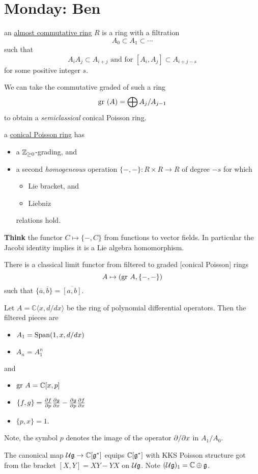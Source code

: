 \newpage 
\section{Monday: Ben}

\begin{definition} 
an \underline{almost commutative ring} $R$ is a ring with a filtration 
\[
    A_0 \subset A_1 \subset \cdots     
\]
such that 
\[
    A_i A_j \subset A_{i+ j} \textrm{ and for }   [A_i , A_j] \subset A_{i+j - s}    
\]
for some positive integer $s$.
\end{definition}

We can take the commutative graded of such a ring
\[
    {\rm gr ~}(A) = \bigoplus A_j / A_{j-1}    
\]
to obtain a \textit{semiclassical} conical Poisson ring.  

\begin{definition} 
a \underline{conical Poisson ring} has
\begin{itemize}
    \item a $\mathbb{Z}_{\ge 0}$-grading, and 
    \item a second \textit{homogeneous} operation $\{-,-\}: R\times R \rightarrow R$ of degree $-s$ for which 
    \begin{itemize}
        \item Lie bracket, and 
        \item Liebniz
    \end{itemize} relations hold.
\end{itemize} 
\end{definition}

\textbf{Think} the functor $C \mapsto \{ - , C\}$ from functions to vector fields. In particular the Jacobi identity implies it is a Lie algebra homomorphism. 

\begin{remark} 
There is a classical limit functor from filtered to graded [conical Poisson] rings 
\[
    A \mapsto ({\rm gr ~} A, \{-,-\})
\] 
such that $\{\overline{a},\overline{b}\} = \overline{[a,b]}$. 
\end{remark}

\begin{example} 
Let $A = \mathbb{C}\langle x,d/dx\rangle$ be the ring of polynomial differential operators. Then the filtered pieces are 
\begin{itemize}
    \item $A_1 = {\rm Span}(1,x,d/dx)$
    \item $A_n = A_1^n$
\end{itemize} 
and 
\begin{itemize}
    \item ${\rm gr ~} A = \mathbb{C} [x,p]$
    \item $\{ f,g \} = \frac{\partial f}{\partial p} \frac{\partial g}{\partial x} - \frac{\partial g}{\partial p}\frac{\partial f}{\partial x}$
    \item $\{ p,x\} = 1$.
\end{itemize}
Note, the symbol $p$ denotes the image of the operator $\partial/\partial x$ in $A_1/A_0$. 
\end{example}

\begin{example} 
The canonical map $\mathcal{U}\mathfrak{g}\rightarrow \mathbb{C}[\mathfrak{g}^\ast]$ equips $\mathbb{C}[\mathfrak{g}^\ast]$ with KKS Poisson structure got from the bracket $[X,Y] = XY - YX$ on $\mathcal{U}\mathfrak{g}$. Note $(\mathcal{U}\mathfrak{g})_1 = \mathbb{C}\oplus \mathfrak{g}$. 
\end{example}
